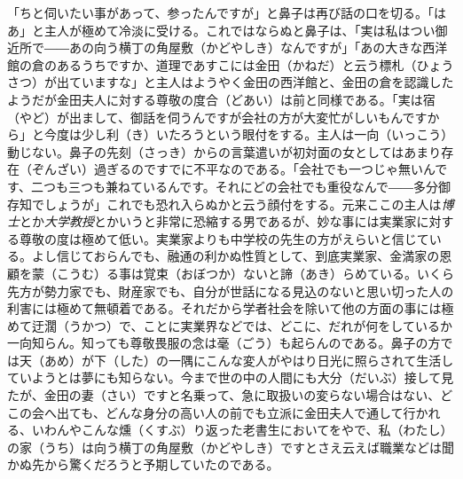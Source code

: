 \documentclass{book}
\begin{document}
「ちと伺いたい事があって、参ったんですが」と鼻子は再び話の口を切る。「はあ」と主人が極めて冷淡に受ける。これではならぬと鼻子は、「実は私はつい御近所で――あの向う横丁の角屋敷（かどやしき）なんですが」「あの大きな西洋館の倉のあるうちですか、道理であすこには金田（かねだ）と云う標札（ひょうさつ）が出ていますな」と主人はようやく金田の西洋館と、金田の倉を認識したようだが金田夫人に対する尊敬の度合（どあい）は前と同様である。「実は宿（やど）が出まして、御話を伺うんですが会社の方が大変忙がしいもんですから」と今度は少し利（き）いたろうという眼付をする。主人は一向（いっこう）動じない。鼻子の先刻（さっき）からの言葉遣いが初対面の女としてはあまり存在（ぞんざい）過ぎるのですでに不平なのである。「会社でも一つじゃ無いんです、二つも三つも兼ねているんです。それにどの会社でも重役なんで――多分御存知でしょうが」これでも恐れ入らぬかと云う顔付をする。元来ここの主人は\emph{博士}とか\emph{大学教授}とかいうと非常に恐縮する男であるが、妙な事には実業家に対する尊敬の度は極めて低い。実業家よりも中学校の先生の方がえらいと信じている。よし信じておらんでも、融通の利かぬ性質として、到底実業家、金満家の恩顧を蒙（こうむ）る事は覚束（おぼつか）ないと諦（あき）らめている。いくら先方が勢力家でも、財産家でも、自分が世話になる見込のないと思い切った人の利害には極めて無頓着である。それだから学者社会を除いて他の方面の事には極めて迂濶（うかつ）で、ことに実業界などでは、どこに、だれが何をしているか一向知らん。知っても尊敬畏服の念は毫（ごう）も起らんのである。鼻子の方では天（あめ）が下（した）の一隅にこんな変人がやはり日光に照らされて生活していようとは夢にも知らない。今まで世の中の人間にも大分（だいぶ）接して見たが、金田の妻（さい）ですと名乗って、急に取扱いの変らない場合はない、どこの会へ出ても、どんな身分の高い人の前でも立派に金田夫人で通して行かれる、いわんやこんな燻（くすぶ）り返った老書生においてをやで、私（わたし）の家（うち）は向う横丁の角屋敷（かどやしき）ですとさえ云えば職業などは聞かぬ先から驚くだろうと予期していたのである。
\end{document}
